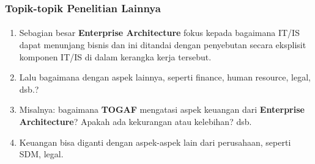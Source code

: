 \documentclass[aspectratio=169, table]{beamer}
\begin{document}
	\begin{frame}
		\frametitle{Topik-topik Penelitian Lainnya}
		\framesubtitle{\hspace{1cm}}
		\begin{enumerate}
			\item Sebagian besar \textbf{Enterprise Architecture} fokus kepada bagaimana IT/IS dapat menunjang bisnis dan ini ditandai dengan penyebutan secara eksplisit komponen IT/IS di dalam kerangka kerja tersebut.
			\item Lalu bagaimana dengan aspek lainnya, seperti finance, human resource, legal, dsb.?
			\item Misalnya: bagaimana \textbf{TOGAF} mengatasi aspek keuangan dari \textbf{Enterprise Architecture}? Apakah ada kekurangan atau kelebihan? dsb.
			\item Keuangan bisa diganti dengan aspek-aspek lain dari perusahaan, seperti SDM, legal.
		\end{enumerate}
	\end{frame}
\end{document}

